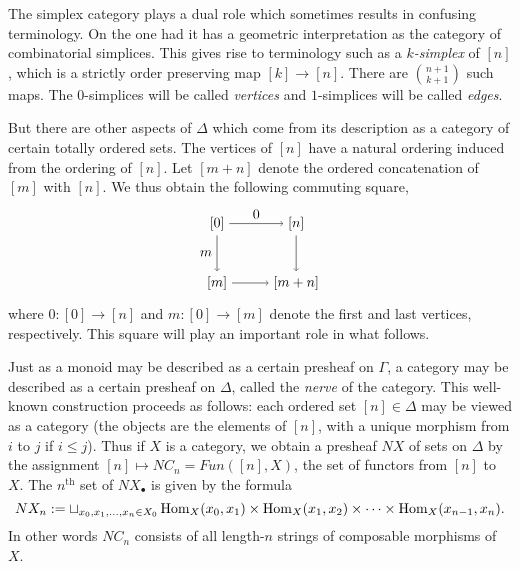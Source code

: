 \documentclass{amsart}
\begin{document}
The simplex category plays a dual role which sometimes results in confusing terminology. On the one had it has a geometric interpretation as the category of combinatorial simplices. This gives rise to terminology such as a {\em $k$-simplex} of $[n]$, which is a strictly order preserving map $[k] \to [n]$. There are $ {n+1}\choose {k+1}$ such maps. The $0$-simplices will be called {\em vertices} and $1$-simplices will be called {\em edges}. 

But there are other aspects of $\Delta$ which come from its description as a category of certain totally ordered sets. The vertices of $[n]$ have a natural ordering induced from the ordering of $[n]$. Let $[m + n]$ denote the ordered concatenation of $[m]$ with $[n]$. We thus obtain the following commuting square, 
\begin{equation} \label{Eqn:Segal-Co-Map}  
\begin{tikzpicture}[baseline = 0.75cm]
	\node (LT) at (0, 1.5) {$[0]$};
	\node (LB) at (0, 0) {$[m]$};
	\node (RT) at (2, 1.5) {$[n]$};
	\node (RB) at (2, 0) {$[m+n]$};
	\draw [->] (LT) -- node [left] {$m$} (LB);
	\draw [->] (LT) -- node [above] {$0$} (RT);
	\draw [->] (RT) -- node [right] {$$} (RB);
	\draw [->] (LB) -- node [below] {$$} (RB);
\end{tikzpicture}
\end{equation}
where $0: [0] \to [n]$ and $m: [0] \to [m]$ denote the first and last vertices, respectively. This square will play an important role in what follows. 

Just as a monoid may be described as a certain presheaf on $\Gamma$, a category may be described as a certain presheaf on $\Delta$, called the {\em nerve} of the category. 
This well-known construction proceeds as follows: each ordered set $[n] \in \Delta$ may be viewed as a category (the objects are the elements of $[n]$, with a unique morphism from $i$ to $j$ if $i \leq j$). Thus if $X$ is a category, we obtain a presheaf $NX$ of sets on $\Delta$ by the assignment $[n] \mapsto NC_n = Fun([n], X)$, the set of functors from $[n]$ to $X$.    
The $n^\textrm{th}$ set of $NX_{\bullet}$ is given by the formula
\begin{equation*}
	NX_n := \sqcup_{x_0, x_1, \dots, x_n \in X_0} \operatorname{Hom}_X(x_0, x_1) \times \operatorname{Hom}_X(x_1, x_2) \times \cdots \times \operatorname{Hom}_X(x_{n-1}, x_n).
\end{equation*} 
In other words $NC_n$ consists of all length-$n$ strings of composable morphisms of $X$.
\end{document}
